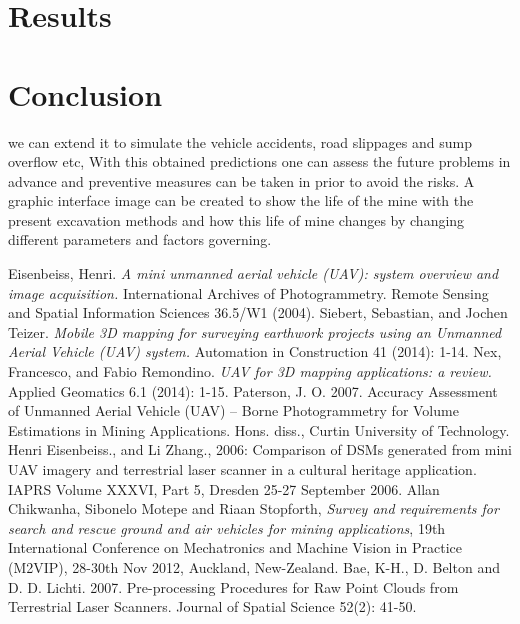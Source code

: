 \documentclass[conference]{IEEEtran}
\begin{document}
\section{Results}
\section{Conclusion}
we can extend it to simulate the vehicle accidents, road slippages and sump overflow etc, With this obtained predictions one can assess the future problems in advance and preventive measures can be taken in prior to avoid the risks. A graphic interface image can be created to show the life of the mine with the present excavation methods and how this life of mine changes by changing different parameters and factors governing. 
\begin{thebibliography}{1}

\bibitem{}

Eisenbeiss, Henri. \emph{A mini unmanned aerial vehicle (UAV): system overview and image acquisition.} International Archives of Photogrammetry. Remote Sensing and Spatial Information Sciences 36.5/W1 (2004).
\bibitem{}
Siebert, Sebastian, and Jochen Teizer. \emph{Mobile 3D mapping for surveying earthwork projects using an Unmanned Aerial Vehicle (UAV) system.} Automation in Construction 41 (2014): 1-14.
\bibitem{}
Nex, Francesco, and Fabio Remondino. \emph{UAV for 3D mapping applications: a review.} Applied Geomatics 6.1 (2014): 1-15.
\bibitem{}
Paterson, J. O. 2007. Accuracy Assessment of Unmanned Aerial Vehicle (UAV) – Borne Photogrammetry for Volume Estimations in Mining Applications. Hons. diss., Curtin University of Technology. 
\bibitem{}
Henri Eisenbeiss., and Li Zhang., 2006: Comparison of DSMs generated from mini UAV imagery and terrestrial laser scanner in a cultural heritage application. IAPRS Volume XXXVI, Part 5, Dresden 25-27 September 2006.
\bibitem{}
Allan Chikwanha, Sibonelo Motepe and Riaan Stopforth, \emph{Survey and requirements for search and rescue ground and air vehicles for mining applications}, 19th International Conference on Mechatronics and Machine Vision in Practice (M2VIP), 28-30th Nov 2012, Auckland, New-Zealand.
\bibitem{}
Bae, K-H., D. Belton and D. D. Lichti. 2007. Pre-processing Procedures for Raw Point Clouds from Terrestrial Laser Scanners. Journal of Spatial Science 52(2): 41-50. 

\end{thebibliography}
\end{document}
